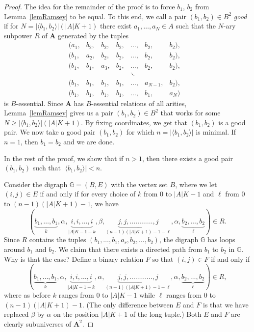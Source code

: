 \documentclass{amsart}
\theoremstyle{plain}
\theoremstyle{definition}
\begin{document}
\begin{proof}
 The idea for the remainder of the proof is to force $b_1$, $b_2$ from Lemma~\ref{lemRamsey} to be equal.
  To this end, we call a pair $(b_1,b_2)\in B^2$ \emph{good} if for
 $N=|\langle b_1,b_2\rangle|(|A|K+1)$ there exist $a_1,\dots,a_N\in A$ such
 that the $N$-ary subpower $R$ of ${{\mathbf{A}}}$ generated
  by the tuples
  \[
  \begin{matrix}
    (a_1,&b_2,&b_2,&b_2,&\dots,&b_2,&b_2),&\\
    (b_1,&a_2,&b_2,&b_2,&\dots,&b_2,&b_2),&\\
    (b_1,&b_1,&a_3,&b_2,&\dots,&b_2,&b_2),&\\
		       &&&&\ddots&\\
    (b_1,&b_1,&b_1,&b_1,&\dots,&a_{N-1},&b_2),&\\
  (b_1,&b_1,&b_1,&b_1,&\dots,&b_1,&a_N)
  \end{matrix}
\]
  is $B$-essential. Since ${{\mathbf{A}}}$ has $B$-essential relations of all arities,  Lemma~\ref{lemRamsey} gives us a pair $(b_1,b_2)\in B^2$
  that works for some $N\geq |\langle b_1,b_2\rangle|(|A|K+1)$. By fixing 
  coordinates, we get that $(b_1,b_2)$ is a good pair.
  We now take  a good pair $(b_1,b_2)$ for which $n=|\langle b_1,b_2\rangle|$ is
  minimal. If $n=1$, then $b_1=b_2$ and we are done.

In the rest of the proof, we show that if $n>1$, then there exists a good pair
$(b_1,b_2)$ such that $|\langle b_1,b_2\rangle|<n$. 

Consider the digraph ${\mathbb{{G}}}=(B,E)$ with the vertex set $B$, where we let $(i,j)\in E$ if
and only if for every choice of $k$ from 0 to $|A|K-1$ and $\ell$ from 0 to $(n-1)(|A|K+1)-1$,
we have
\[  
  (\underbrace{b_1,\dots,b_1}_{k},\alpha,\underbrace{i,i,\dots,i}_{|A|K-1-k},\beta,\underbrace{j,j,\dots\dots\dots\dots,j}_{(n-1)(|A|K+1)-1-\ell},\alpha,\underbrace{b_2,\dots,b_2}_{\ell})\in
  R.
\]
Since $R$ contains the tuples $(b_1,\dots,b_1,a_r,b_2,\dots,b_2)$, the digraph
${\mathbb{{G}}}$ has loops around $b_1$ and $b_2$.  
We claim
that there exists a directed path from $b_1$ to $b_2$ in ${\mathbb{{G}}}$. Why is that the
case? Define a binary relation $F$ so that $(i,j)\in F$ if
and only if 
\[  
  (\underbrace{b_1,\dots,b_1}_{k},\alpha,\underbrace{i,i,\dots,i}_{|A|K-1-k},\alpha,\underbrace{j,j,\dots\dots\dots\dots,j}_{(n-1)(|A|K+1)-1-\ell},\alpha,\underbrace{b_2,\dots,b_2}_{\ell})\in
  R,
\]
where as before $k$ ranges from 0 to $|A|K-1$ while $\ell$ ranges from 0 to $(n-1)(|A|K+1)-1$.
(The only difference between $E$ and $F$ is that we
have replaced $\beta$ by $\alpha$ on the position $|A|K+1$ of the long tuple.) Both $E$ and $F$ are clearly subuniverses of ${{\mathbf{A}}}^2$.


\end{proof}
\end{document}
